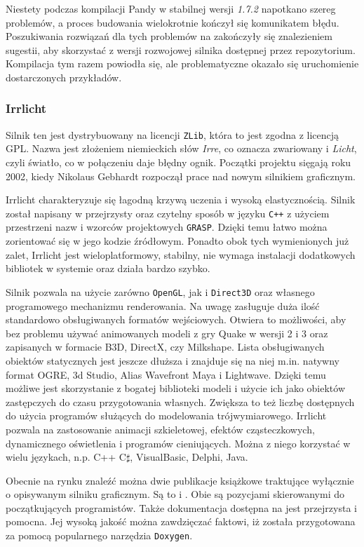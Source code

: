 \documentclass[11pt]{mwrep}
\begin{document}
      Niestety podczas kompilacji Pandy w stabilnej wersji \textit{1.7.2} napotkano szereg problemów, a proces budowania wielokrotnie kończył się komunikatem błędu. Poszukiwania rozwiązań dla tych problemów na \cite{pandaf} zakończyły się znalezieniem sugestii, aby skorzystać z wersji rozwojowej silnika dostępnej przez repozytorium. Kompilacja tym razem powiodła się, ale problematyczne okazało się uruchomienie dostarczonych przykładów. 
\pagebreak
      \subsubsection{Irrlicht}

      Silnik ten jest dystrybuowany na licencji \texttt{ZLib}, która to jest zgodna z licencją GPL. Nazwa jest złożeniem niemieckich słów \textit{Irre}, co oznacza zwariowany i \textit{Licht}, czyli światło, co w połączeniu daje błędny ognik. Początki projektu sięgają roku 2002, kiedy Nikolaus Gebhardt rozpoczął prace nad nowym silnikiem graficznym.

      Irrlicht charakteryzuje się łagodną krzywą uczenia i wysoką elastycznością. Silnik został napisany w przejrzysty oraz czytelny sposób w języku \texttt{C++} z użyciem przestrzeni nazw i wzorców projektowych \texttt{GRASP}. Dzięki temu łatwo można zorientować się w jego kodzie źródłowym. Ponadto obok tych wymienionych już zalet, Irrlicht jest wieloplatformowy, stabilny, nie wymaga instalacji dodatkowych bibliotek w systemie oraz działa bardzo szybko.

      Silnik pozwala na użycie zarówno \texttt{OpenGL}, jak i \texttt{Direct3D} oraz własnego programowego mechanizmu renderowania. Na uwagę zasługuje duża ilość standardowo obsługiwanych formatów wejściowych. Otwiera to możliwości, aby bez problemu używać animowanych modeli z gry Quake w wersji 2 i 3 oraz zapisanych w formacie B3D, DirectX, czy Milkshape. Lista obsługiwanych obiektów statycznych jest jeszcze dłuższa i znajduje się na niej m.in. natywny format OGRE, 3d Studio, Alias Wavefront Maya i Lightwave. Dzięki temu możliwe jest skorzystanie z bogatej biblioteki modeli i użycie ich jako obiektów zastępczych do czasu przygotowania własnych. Zwiększa to też liczbę dostępnych do użycia programów służących do modelowania trójwymiarowego. Irrlicht pozwala na zastosowanie animacji szkieletowej, efektów cząsteczkowych, dynamicznego oświetlenia i programów cieniujących. Można z niego korzystać w wielu językach, n.p. C++ C$\sharp$, VisualBasic, Delphi, Java.

       Obecnie na rynku znaleźć można dwie publikacje książkowe traktujące wyłącznie o opisywanym silniku graficznym. Są to \cite{irrlichtb1} i \cite{irrlichtb2}. Obie są pozycjami skierowanymi do początkujących programistów. Także dokumentacja dostępna na \cite{irrlichtw} jest przejrzysta i pomocna. Jej wysoką jakość można zawdzięczać faktowi, iż została przygotowana za pomocą popularnego narzędzia \texttt{Doxygen}.
\end{document}
